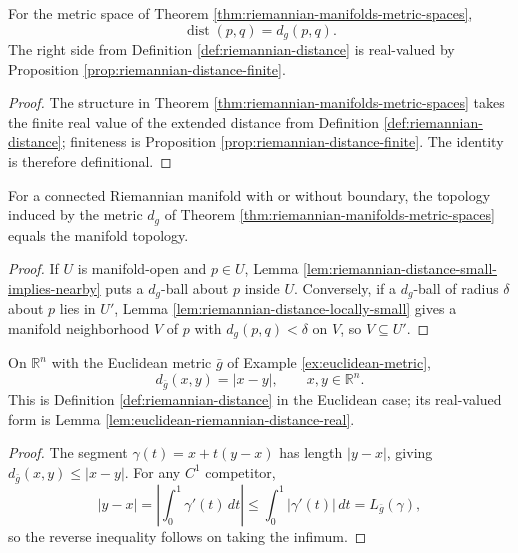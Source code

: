 \begin{lemma}
\label{lem:riemannian-metric-space-dist}
\leanok
{}
For the metric space of Theorem \ref{thm:riemannian-manifolds-metric-spaces},
\[
\operatorname{dist}(p,q)=d_g(p,q).
\]
The right side from Definition \ref{def:riemannian-distance} is real-valued by Proposition \ref{prop:riemannian-distance-finite}.
\end{lemma}
\begin{proof}
\leanok
{}
\sketch The structure in Theorem \ref{thm:riemannian-manifolds-metric-spaces} takes the finite real value of the extended distance from Definition \ref{def:riemannian-distance}; finiteness is Proposition \ref{prop:riemannian-distance-finite}. The identity is therefore definitional.
\end{proof}

\begin{theorem}
\label{thm:riemannian-distance-topology}
\leanok
{}
For a connected Riemannian manifold with or without boundary, the topology induced by the metric $d_g$ of Theorem \ref{thm:riemannian-manifolds-metric-spaces} equals the manifold topology.
\end{theorem}
\begin{proof}
\leanok
{}
\sketch If $U$ is manifold-open and $p\in U$, Lemma \ref{lem:riemannian-distance-small-implies-nearby} puts a $d_g$-ball about $p$ inside $U$. Conversely, if a $d_g$-ball of radius $\delta$ about $p$ lies in $U'$, Lemma \ref{lem:riemannian-distance-locally-small} gives a manifold neighborhood $V$ of $p$ with $d_g(p,q)<\delta$ on $V$, so $V\subseteq U'$.
\end{proof}

\begin{proposition}
\label{prop:euclidean-riemannian-distance}
\leanok
{}
On $\mathbb R^n$ with the Euclidean metric $\bar g$ of Example \ref{ex:euclidean-metric},
\[
d_{\bar g}(x,y)=|x-y|,
\qquad x,y\in\mathbb R^n.
\]
This is Definition \ref{def:riemannian-distance} in the Euclidean case; its real-valued form is Lemma \ref{lem:euclidean-riemannian-distance-real}.
\end{proposition}
\begin{proof}
\leanok
{}
\sketch The segment $\gamma(t)=x+t(y-x)$ has length $|y-x|$, giving $d_{\bar g}(x,y)\le|x-y|$. For any $C^1$ competitor,
\[
|y-x|=\left|\int_0^1\gamma'(t)\,dt\right|\le\int_0^1|\gamma'(t)|\,dt=L_{\bar g}(\gamma),
\]
so the reverse inequality follows on taking the infimum.
\end{proof}

